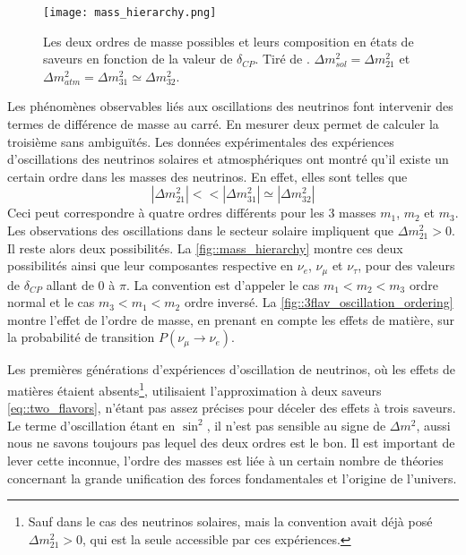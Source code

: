         \begin{figure}[htpb]
          \centering
          \texttt{[image: mass\_hierarchy.png]}
          \caption[Les deux ordres de masse possibles]{\label{fig::mass_hierarchy}Les deux ordres de masse possibles et leurs composition en états de saveurs en fonction de la valeur de $\delta_{CP}$. Tiré de \cite{Qian2015}. $\Delta m^2_{sol}=\Delta m^2_{21}$ et $\Delta m^2_{atm}=\Delta m^2_{31}\simeq\Delta m^2_{32}$.}
        \end{figure}
        Les phénomènes observables liés aux oscillations des neutrinos font intervenir des termes de différence de masse au carré. En mesurer deux permet de calculer la troisième sans ambiguïtés. Les données expérimentales des expériences d'oscillations des neutrinos solaires et atmosphériques ont montré qu'il existe un certain ordre dans les masses des neutrinos. En effet, elles sont telles que
        \begin{equation}\label{eq::mass_hierarchy}
          |\Delta m^2_{21}| <<|\Delta m^2_{31}| \simeq |\Delta m^2_{32}| 
        \end{equation}
        Ceci peut correspondre à quatre ordres différents pour les 3 masses $m_1$, $m_2$ et $m_3$. Les observations des oscillations dans le secteur solaire impliquent que $\Delta m^2_{21} > 0$\cite{pdg2018}. Il reste alors deux possibilités. La \autoref{fig::mass_hierarchy} montre ces deux possibilités ainsi que leur composantes respective en $\nu_e$, $\nu_{\mu}$ et $\nu_{\tau}$, pour des valeurs de $\delta_{CP}$ allant de 0 à $\pi$\cite{Qian2015}. La convention est d'appeler le cas $m_1 < m_2 < m_3$ ordre normal et le cas $m_3 < m_1 < m_2$ ordre inversé. La \autoref{fig::3flav_oscillation_ordering} montre l'effet de l'ordre de masse, en prenant en compte les effets de matière, sur la probabilité de transition $P(\nu_{\mu}\to\nu_e)$.
        
        Les premières générations d'expériences d'oscillation de neutrinos, où les effets de matières étaient absents\footnote{Sauf dans le cas des neutrinos solaires, mais la convention avait déjà posé $\Delta m^2_{21} > 0$, qui est la seule accessible par ces expériences.}, utilisaient l'approximation à deux saveurs \eqref{eq::two_flavors}, n'étant pas assez précises pour déceler des effets à trois saveurs. Le terme d'oscillation étant en $\sin^2$, il n'est pas sensible au signe de $\Delta m^2$, aussi nous ne savons toujours pas lequel des deux ordres est le bon. Il est important de lever cette inconnue, l'ordre des masses est liée à un certain nombre de théories concernant la grande unification des forces fondamentales et l'origine de l'univers\cite{KH-website}.
        
